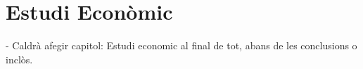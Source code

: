 \chapter{Estudi Econòmic}

- Caldrà afegir capitol: Estudi economic al final de tot, abans de les conclusions o inclòs.
